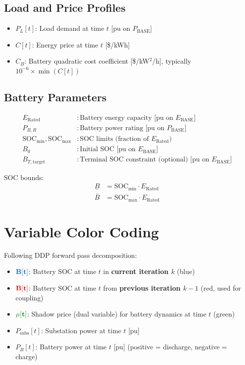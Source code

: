 \documentclass[11pt]{article}
\newcommand{\blueB}[1]{\textcolor{bluevar}{\mathbf{#1}}}      %
\newcommand{\redB}[1]{\textcolor{redvar}{\mathbf{#1}}}        %
\newcommand{\greenmu}[1]{\textcolor{greenvar}{\mathbf{#1}}}   %
\begin{document}
\subsection{Load and Price Profiles}
\begin{itemize}
    \item $P_L[t]$: Load demand at time $t$ [pu on $P_{\text{BASE}}$]
    \item $C[t]$: Energy price at time $t$ [\$/kWh]
    \item $C_B$: Battery quadratic cost coefficient [\$/kW$^2$/h], typically $10^{-6} \times \min(C[t])$
\end{itemize}

\subsection{Battery Parameters}
\begin{align}
E_{\text{Rated}} &: \text{Battery energy capacity [pu on } E_{\text{BASE}}\text{]} \\
P_{B,R} &: \text{Battery power rating [pu on } P_{\text{BASE}}\text{]} \\
\text{SOC}_{\min}, \text{SOC}_{\max} &: \text{SOC limits (fraction of } E_{\text{Rated}}\text{)} \\
B_0 &: \text{Initial SOC [pu on } E_{\text{BASE}}\text{]} \\
B_{T,\text{target}} &: \text{Terminal SOC constraint (optional) [pu on } E_{\text{BASE}}\text{]}
\end{align}

SOC bounds:
\begin{align}
\underline{B} &= \text{SOC}_{\min} \cdot E_{\text{Rated}} \\
\overline{B} &= \text{SOC}_{\max} \cdot E_{\text{Rated}}
\end{align}

\section{Variable Color Coding}

Following DDP forward pass decomposition:
\begin{itemize}
    \item $\blueB{B[t]}$: Battery SOC at time $t$ in \textbf{current iteration $k$} (blue)
    \item $\redB{B[t]}$: Battery SOC at time $t$ from \textbf{previous iteration $k-1$} (red, used for coupling)
    \item $\greenmu{\mu[t]}$: Shadow price (dual variable) for battery dynamics at time $t$ (green)
    \item $P_{\text{subs}}[t]$: Substation power at time $t$ [pu]
    \item $P_B[t]$: Battery power at time $t$ [pu] (positive = discharge, negative = charge)
\end{itemize}
\end{document}
